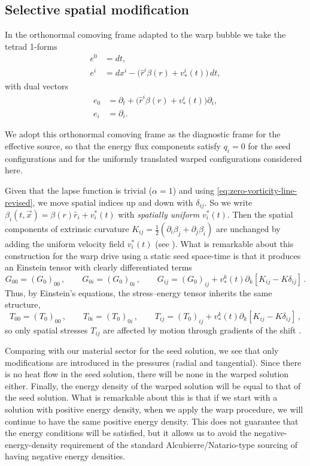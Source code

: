 \documentclass[11pt]{article}
\begin{document}
\subsection{Selective spatial modification}
In the orthonormal comoving frame adapted to the warp bubble we take the tetrad 1-forms
\begin{align}
e^0 &= dt, \\
e^i &= dx^i - \bigl(\hat{r}^i\beta(r) + v^i_*(t)\bigr)\,dt,
\end{align}
with dual vectors
\begin{align}
e_0 &= \partial_t + \bigl(\hat{r}^i\beta(r) + v^i_*(t)\bigr)\partial_i, \\
e_i &= \partial_i.
\end{align}

We adopt this orthonormal comoving frame as the diagnostic frame for the effective source, so that the energy flux components satisfy $q_i=0$ for the seed configurations and for the uniformly translated warped configurations considered here.

Given that the lapse function is trivial ($\alpha=1$) and using \eqref{eq:zero-vorticity-line-revised}, we move spatial indices up and down with $\delta_{ij}$. So we write $\beta_i(t,\vec x)=\beta(r)\hat r_i+v^*_i(t)$ with \emph{spatially uniform} $v^*_i(t)$. Then the spatial components of extrinsic curvature $K_{ij}=\tfrac12(\partial_i\beta_j+\partial_j\beta_i)$ are unchanged by adding the uniform velocity field $v^*_i(t)$ (see \cite{Schuster:2023ADMmass}). What is remarkable about this construction for the warp drive using a static seed space-time is that it produces an Einstein tensor with clearly differentiated terms
\begin{equation}
G_{00}=(G_0)_{00}\,,\qquad G_{0i}=(G_0)_{0i}\,, \qquad
G_{ij}= (G_{0})_{ij} + v^{k}_{*}(t)  \partial_{k}[K_{ij}-K\delta_{ij}]
\,.
\end{equation}
Thus, by Einstein's equations, the stress--energy tensor inherits the same structure,
\begin{equation}
T_{00}=(T_0)_{00}\,,\qquad T_{0i}=(T_0)_{0i}\,, \qquad
T_{ij}= (T_{0})_{ij} + v^{k}_{*}(t)  \partial_{k}[K_{ij}-K\delta_{ij}]\,,
\end{equation}
so only spatial stresses $T_{ij}$ are affected by motion through gradients of the shift
\cite{Santiago:2021aup,Schuster:2023ADMmass}.

Comparing with our material sector for the seed solution, we see that only modifications are introduced in the pressures (radial and tangential). Since there is no heat flow in the seed solution, there will be none in the warped solution either. Finally, the energy density of the warped solution will be equal to that of the seed solution. What is remarkable about this is that if we start with a solution with positive energy density, when we apply the warp procedure, we will continue to have the same positive energy density. This does not guarantee that the energy conditions will be satisfied, but it allows us to avoid the negative-energy-density requirement of the standard Alcubierre/Natario-type sourcing of having negative energy densities.
\end{document}

